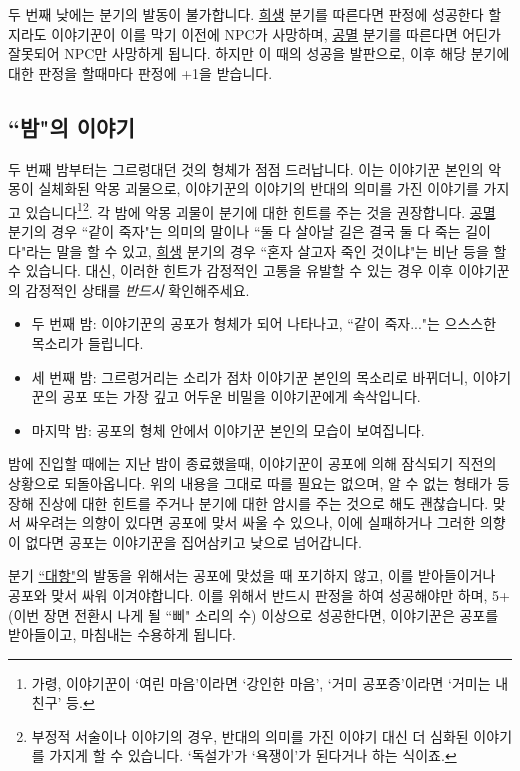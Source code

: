 \documentclass{report}
\begin{document}
		두 번째 낮에는 분기의 발동이 불가합니다. \hyperlink{dream-sacrifice}{희생} 분기를 따른다면 판정에 성공한다 할지라도 이야기꾼이 이를 막기 이전에 NPC가 사망하며, \hyperlink{dream-corrupt}{공멸} 분기를 따른다면 어딘가 잘못되어 NPC만 사망하게 됩니다. 하지만 이 때의 성공을 발판으로, 이후 해당 분기에 대한 판정을 할때마다 판정에 +1을 받습니다.
		
		\subsection{``밤"의 이야기}
		
		두 번째 밤부터는 그르렁대던 것의 형체가 점점 드러납니다. 이는 이야기꾼 본인의 악몽이 실체화된 악몽 괴물으로, 이야기꾼의 이야기의 반대의 의미를 가진 이야기를 가지고 있습니다\footnote{가령, 이야기꾼이 `여린 마음'이라면 `강인한 마음', `거미 공포증'이라면 `거미는 내 친구' 등.}\footnote{부정적 서술이나 이야기의 경우, 반대의 의미를 가진 이야기 대신 더 심화된 이야기를 가지게 할 수 있습니다. `독설가'가 `욕쟁이'가 된다거나 하는 식이죠.}. 각 밤에 악몽 괴물이 분기에 대한 힌트를 주는 것을 권장합니다. \hyperlink{dream-corrupt}{공멸} 분기의 경우 ``같이 죽자"는 의미의 말이나 ``둘 다 살아날 길은 결국 둘 다 죽는 길이다"라는 말을 할 수 있고, \hyperlink{dream-sacrifice}{희생} 분기의 경우 ``혼자 살고자 죽인 것이냐"는 비난 등을 할 수 있습니다. 대신, 이러한 힌트가 감정적인 고통을 유발할 수 있는 경우 이후 이야기꾼의 감정적인 상태를 \emph{반드시} 확인해주세요.
		
		\begin{itemize}
			\item 두 번째 밤: 이야기꾼의 공포가 형체가 되어 나타나고, ``같이 죽자..."는 으스스한 목소리가 들립니다.
			\item 세 번째 밤: 그르렁거리는 소리가 점차 이야기꾼 본인의 목소리로 바뀌더니, 이야기꾼의 공포 또는 가장 깊고 어두운 비밀을 이야기꾼에게 속삭입니다.
			\item 마지막 밤: 공포의 형체 안에서 이야기꾼 본인의 모습이 보여집니다.
		\end{itemize}
		
		밤에 진입할 때에는 지난 밤이 종료했을때, 이야기꾼이 공포에 의해 잠식되기 직전의 상황으로 되돌아옵니다. 위의 내용을 그대로 따를 필요는 없으며, 알 수 없는 형태가 등장해 진상에 대한 힌트를 주거나 분기에 대한 암시를 주는 것으로 해도 괜찮습니다. 맞서 싸우려는 의향이 있다면 공포에 맞서 싸울 수 있으나, 이에 실패하거나 그러한 의향이 없다면 공포는 이야기꾼을 집어삼키고 낮으로 넘어갑니다.
		
		분기 \hyperlink{dream-fight}{``대항"}의 발동을 위해서는 공포에 맞섰을 때 포기하지 않고, 이를 받아들이거나 공포와 맞서 싸워 이겨야합니다. 이를 위해서 반드시 판정을 하여 성공해야만 하며, 5+(이번 장면 전환시 나게 될 ``삐" 소리의 수) 이상으로 성공한다면, 이야기꾼은 공포를 받아들이고, 마침내는 수용하게 됩니다.
		
\end{document}
